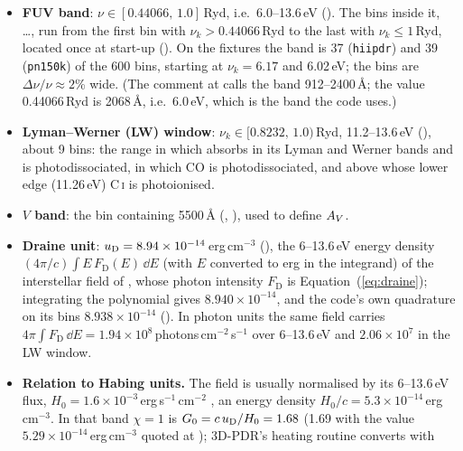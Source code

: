 \begin{itemize}
\item \textbf{FUV band}: $\nu\in[0.44066,\,1.0]$\,Ryd, i.e.\ 6.0--13.6\,eV
  (). The bins inside it,
  \ldots{}, run from the first bin with $\nu_k>0.44066$\,Ryd
  to the last with $\nu_k\le1$\,Ryd, located once at start-up
  (). On the fixtures the band is 37
  (\texttt{hiipdr}) and 39 (\texttt{pn150k}) of the 600 bins, starting at
  $\nu_k=6.17$ and 6.02\,eV; the bins are $\Delta\nu/\nu\approx2$\% wide. (The
  comment at  calls the band 912--2400\,\AA;
  the value 0.44066\,Ryd is 2068\,\AA, i.e.\ 6.0\,eV, which is the band the
  code uses.)
\item \textbf{Lyman--Werner (LW) window}: $\nu_k\in[0.8232,\,1.0)$\,Ryd,
  11.2--13.6\,eV (), about 9 bins: the range in
  which \Htwo{} absorbs in its Lyman and Werner bands and is photodissociated,
  in which CO is photodissociated, and above whose lower edge (11.26\,eV)
  C\,\textsc{i} is photoionised.
\item \textbf{$V$ band}: the bin containing 5500\,\AA{} (,
  ), used to define $A_{V}$.
\item \textbf{Draine unit}: $u_{\mathrm{D}} = 8.94\times10^{-14}$\,erg\,cm$^{-3}$
  (), the 6--13.6\,eV energy density
  $(4\pi/c)\int E\,F_{\mathrm D}(E)\,\dd E$ (with $E$ converted to erg in the
  integrand) of the interstellar field of \citet{Draine1978}, whose photon
  intensity $F_{\mathrm D}$ is Equation~(\ref{eq:draine}); integrating the polynomial gives
  $8.940\times10^{-14}$, and the code's own quadrature on its bins
  $8.938\times10^{-14}$ (). In photon units the
  same field carries $4\pi\int F_{\mathrm D}\,\dd E=1.94\times10^{8}$\,photons\,cm$^{-2}$\,s$^{-1}$
  over 6--13.6\,eV and $2.06\times10^{7}$ in the LW window.
\item \textbf{Relation to Habing units.} The \citet{Habing1968} field is
  usually normalised by its 6--13.6\,eV flux,
  $H_0=1.6\times10^{-3}$\,erg\,s$^{-1}$\,cm$^{-2}$ \citep[as in][]{Bisbas2015}, an
  energy density $H_0/c=5.3\times10^{-14}$\,erg\,cm$^{-3}$. In that band
  $\chi=1$ is $G_0=c\,u_{\mathrm{D}}/H_0=1.68$ (1.69 with the value
  $5.29\times10^{-14}$\,erg\,cm$^{-3}$ quoted at
  ); 3D-PDR's heating routine converts with

\end{itemize}
